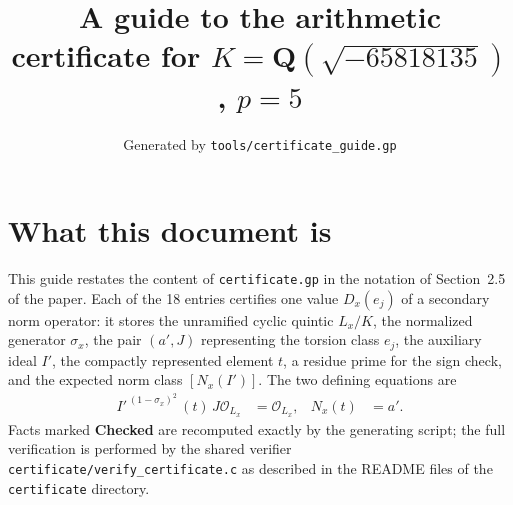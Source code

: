 \documentclass[11pt]{article}
\title{A guide to the arithmetic certificate for $K=\mathbf Q(\sqrt{-65818135})$, $p=5$}
\author{}
\date{Generated by \texttt{tools/certificate\_guide.gp}}
\begin{document}
\maketitle
\section*{What this document is}
This guide restates the content of \texttt{certificate.gp} in the
notation of Section~2.5 of the paper.  Each of the 18 entries
certifies one value $D_x(e_j)$ of a secondary norm operator: it
stores the unramified cyclic quintic $L_x/K$, the normalized
generator $\sigma_x$, the pair $(a',J)$ representing the torsion
class $e_j$, the auxiliary ideal $I'$, the compactly represented
element $t$, a residue prime for the sign check, and the expected
norm class $[N_x(I')]$.  The two defining equations are
\begin{align*}
I'^{\,(1-\sigma_x)^2}\,(t)\,J\mathcal O_{L_x}&=\mathcal O_{L_x},&
N_x(t)&=a'.
\end{align*}
Facts marked \textbf{Checked} are recomputed exactly by the
generating script; the full verification is performed by the
shared verifier \texttt{certificate/verify\_certificate.c} as
described in the README files of the \texttt{certificate}
directory.
\end{document}
